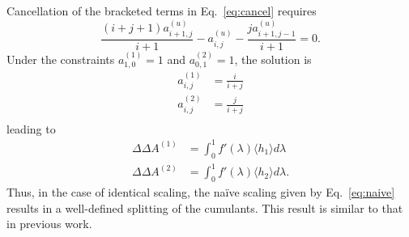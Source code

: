\documentclass{article}
\begin{document}
Cancellation of the bracketed terms in Eq.~\ref{eq:cancel} requires
\begin{equation}
\frac
	{(i+j+1)a_{i+1,j}^{(u)}}
	{i+1} -
a_{i,j}^{(u)} -
\frac
	{j a_{i+1,j-1}^{(u)}}
	{i+1}
= 0.
\end{equation}
Under the constraints $a_{1,0}^{(1)} = 1$ and $a_{0,1}^{(2)} = 1$, the solution is
\begin{align}
a_{i,j}^{(1)} &= \frac{i}{i+j} \nonumber\\
a_{i,j}^{(2)} &= \frac{j}{i+j} \nonumber\\
\label{eq:splitting}
\end{align}
leading to
\begin{equation}
\begin{split}
\Delta\Delta A^{(1)} &= 
	\int_0^1 f'(\lambda)
    \langle h_1 \rangle 
    d\lambda \\
\Delta\Delta A^{(2)} &= 
	\int_0^1 f'(\lambda)
    \langle h_2 \rangle
    d\lambda.
\end{split}
\end{equation}
Thus, in the case of identical scaling, the na\"ive scaling given by Eq.~\ref{eq:naive} results in a well-defined splitting of the cumulants. This result is similar to that in previous work.
\end{document}
